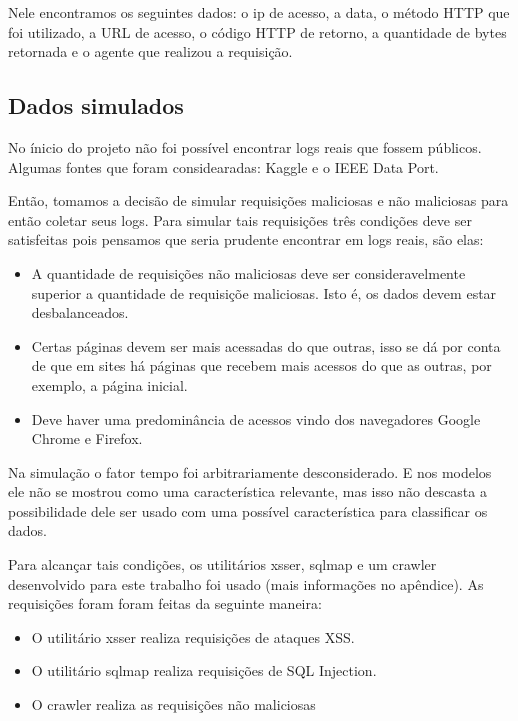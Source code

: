 Nele encontramos os seguintes dados: o ip de acesso, a data, o método HTTP que foi utilizado, 
a URL de acesso, o código HTTP de retorno, a quantidade de bytes retornada e o agente que realizou a requisição.


\subsection{Dados simulados}

No ínicio do projeto não foi possível encontrar logs reais que fossem públicos. Algumas fontes
que foram considearadas: Kaggle e o IEEE Data Port.

Então, tomamos a decisão de simular requisições maliciosas e não maliciosas para então coletar seus logs. 
Para simular tais requisições três condições deve ser satisfeitas pois pensamos que seria prudente encontrar
em logs reais, são elas:

\begin{itemize}
    \item A quantidade de requisições não maliciosas deve ser consideravelmente
    superior a quantidade de requisiçõe maliciosas. Isto é, os dados devem estar desbalanceados.
    \item Certas páginas devem ser mais acessadas do que outras, isso se dá por conta 
    de que em sites há páginas que recebem mais acessos do que as outras, por exemplo, a página inicial.
    \item Deve haver uma predominância de acessos vindo dos navegadores Google Chrome e Firefox.
\end{itemize}

Na simulação o fator tempo foi arbitrariamente desconsiderado. E nos modelos ele não se mostrou 
como uma característica relevante, mas isso não descasta a possibilidade dele ser usado com uma possível
característica para classificar os dados.

Para alcançar tais condições, os utilitários xsser, sqlmap e um crawler desenvolvido para 
este trabalho foi usado (mais informações no apêndice). As requisições foram foram feitas da seguinte maneira:

\begin{itemize}
    \item O utilitário xsser realiza requisições de ataques XSS.
    \item O utilitário sqlmap realiza requisições de SQL Injection.
    \item O crawler realiza as requisições não maliciosas
\end{itemize}


